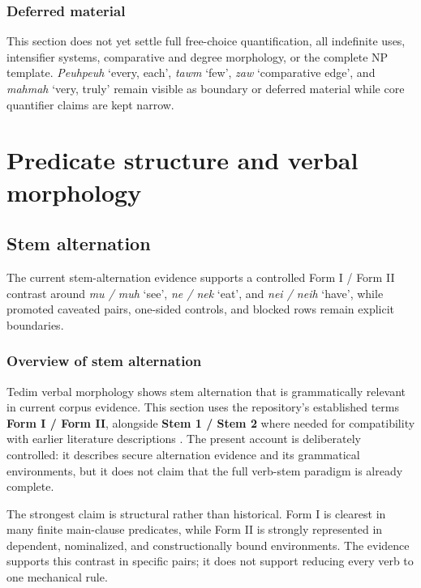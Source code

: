 \documentclass[
  11pt,
  a4paper,
]{article}
\newcommand{\tdim}[1]{\textit{#1}}
\newcommand{\glossquote}[1]{`#1'}
\newcounter{reviewchapter}
\newcommand{\reviewchapterbreak}{\stepcounter{reviewchapter}\setcounter{xnumi}{0}}
\begin{document}
\subsubsection{Deferred material}\label{deferred-material-4}

This section does not yet settle full free-choice quantification, all
indefinite uses, intensifier systems, comparative and degree morphology,
or the complete NP template. \tdim{Peuhpeuh} \glossquote{every, each},
\tdim{tawm} \glossquote{few}, \tdim{zaw} \glossquote{comparative edge},
and \tdim{mahmah} \glossquote{very, truly} remain visible as boundary or
deferred material while core quantifier claims are kept narrow.

\reviewchapterbreak

\section{Predicate structure and verbal
morphology}\label{predicate-structure-and-verbal-morphology}

\subsection{Stem alternation}\label{stem-alternation}

The current stem-alternation evidence supports a controlled Form I /
Form II contrast around \tdim{mu / muh} \glossquote{see},
\tdim{ne / nek} \glossquote{eat}, and \tdim{nei / neih}
\glossquote{have}, while promoted caveated pairs, one-sided controls,
and blocked rows remain explicit boundaries.

\subsubsection{Overview of stem
alternation}\label{overview-of-stem-alternation}

Tedim verbal morphology shows stem alternation that is grammatically
relevant in current corpus evidence. This section uses the repository's
established terms \textbf{Form I / Form II}, alongside \textbf{Stem 1 /
Stem 2} where needed for compatibility with earlier literature
descriptions \citep{henderson1965, zamngaihcing2017}. The present
account is deliberately controlled: it describes secure alternation
evidence and its grammatical environments, but it does not claim that
the full verb-stem paradigm is already complete.

The strongest claim is structural rather than historical. Form I is
clearest in many finite main-clause predicates, while Form II is
strongly represented in dependent, nominalized, and constructionally
bound environments. The evidence supports this contrast in specific
pairs; it does not support reducing every verb to one mechanical rule.
\end{document}
